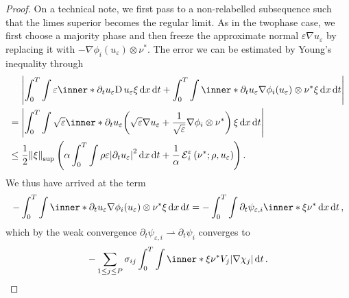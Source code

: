 \begin{proof}
	On a technical note, we first pass to a non-relabelled subsequence such 
	that the limes superior becomes the regular limit.
	As in the twophase case, we first choose a majority phase and then freeze 
	the approximate normal $ \varepsilon \nabla u_{ \varepsilon } $ by 
	replacing it with $ - \nabla \phi_{ i } ( u_{ \varepsilon } ) \otimes \nu^{ 
	\ast } $. The error we can be estimated by Young's inequality through
	\begin{align*}
		& \abs{
			\int_{ 0 }^{ T }
				\int
					\varepsilon
					\inner*{ \partial_{  t } u_{ 
					\varepsilon } }{ \diff u_{ \varepsilon } \xi }
				\dd{ x }
			\dd{ t }
			+
			\int_{ 0 }^{ T }
				\int
					\inner*{ \partial_{ t } u_{ \varepsilon } }{ \nabla \phi_{ 
					i } ( u_{ \varepsilon } ) \otimes 
					\nu^{ \ast } \xi }
				\dd{ x }
			\dd{ t }
		}
		\\
		={} &
		\abs{
			\int_{ 0 }^{ T }
				\int
					\sqrt{ \varepsilon }
					\inner*
					{ \partial_{ t } u_{ \varepsilon } }{ 
						\left(
							\sqrt{ \varepsilon } \nabla u_{ \varepsilon }
							+
							\frac{ 1 }{ \sqrt{ \varepsilon } }
							\nabla \phi_{ i } \otimes \nu^{ \ast } 
						\right)
						\xi 
					}
				\dd{ x }
			\dd{ t }
		}
		\\
		\leq{} &
		\frac{ 1 }{ 2 }
		\norm{ \xi }_{ \mathrm{sup} }
		\left(
			\alpha 
			\int_{ 0 }^{ T }
				\int
					\rho \varepsilon 
					\abs{ \partial_{ t } u_{ \varepsilon } }^{ 2 }
				\dd{ x }
			\dd{ t }
			+
			\frac{ 1 }{ \alpha }
			\tilt_excess_{ i }^{ \varepsilon } \left( \nu^{ \ast } ; \rho , 
			u_{ 
			\varepsilon }  \right)
		\right).
	\end{align*}
	We thus have arrived at the term
	\begin{equation*}
		- \int_{ 0 }^{ T }
			\int
				\inner*{ \partial_{ t } u_{ \varepsilon } }{ \nabla \phi_{ i } 
				( u_{ \varepsilon } ) \otimes \nu^{ 
				\ast } \xi }
			\dd{ x }
		\dd{ t }
		= 
		- \int_{ 0 }^{ T }
			\int
				\partial_{ t } \psi_{ \varepsilon , i }
				\inner*{ \xi }{ \nu^{ \ast } }
			\dd{ x }
		\dd{ t },
	\end{equation*} 
	which by the weak convergence $ \partial_{ t } \psi_{ \varepsilon,  i } 
	\rightharpoonup \partial_{ t } \psi_{ i } $ converges to
	\begin{equation*}
		- \sum_{ 1 \leq j \leq P }
			\sigma_{ i j }
			\int_{ 0 }^{ T }
				\int
					\inner*{ \xi }{ \nu^{ \ast } }
					V_{ j }
				\abs{ \nabla \chi_{ j } }
			\dd{ t }.
	\end{equation*}

\end{proof}
